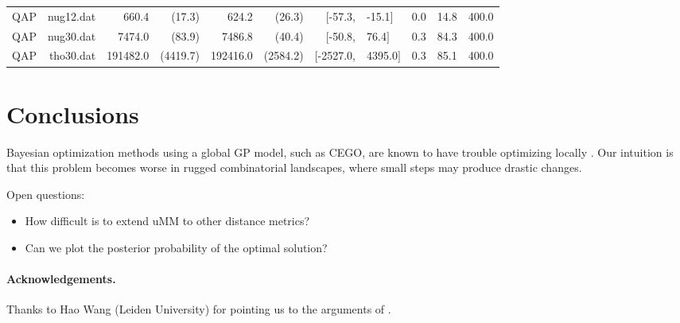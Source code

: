 \documentclass[runningheads]{llncs}
\begin{document}
\begin{table}
{\begin{tabular}{*{6}{r}rl*{3}{r}}
    QAP &      nug12.dat &          660.4&(17.3) &           624.2&(26.3) &         $[$-57.3,&-15.1$]$ &          0.0 &          14.8 &                400.0 \\
    QAP &      nug30.dat &         7474.0&(83.9) &          7486.8&(40.4) &          $[$-50.8,&76.4$]$ &          0.3 &          84.3 &                400.0 \\
    QAP &      tho30.dat &     191482.0&(4419.7) &      192416.0&(2584.2) &      $[$-2527.0,&4395.0$]$ &          0.3 &          85.1 &                400.0 \\
\bottomrule
\end{tabular}}
\end{table}




\section{Conclusions}

Bayesian optimization methods using a global GP model, such as CEGO, are known
to have trouble optimizing locally \citep{EriPeaGar2019scalable}. Our
intuition is that this problem becomes worse in rugged combinatorial
landscapes, where small steps may produce drastic changes.

Open questions:
\begin{itemize}
\item How difficult is to extend uMM to other distance metrics?
\item Can we plot the posterior probability of the optimal solution?
\end{itemize}

\paragraph*{Acknowledgements.}

Thanks to Hao Wang (Leiden University) for pointing us to the arguments of
\citet{EriPeaGar2019scalable}.




\renewcommand{\doi}[1]{doi:\hspace{.16667em plus .08333em}\discretionary{}{}{}\href{https://doi.org/#1}{\urlstyle{rm}\nolinkurl{#1}}}


\end{document}
